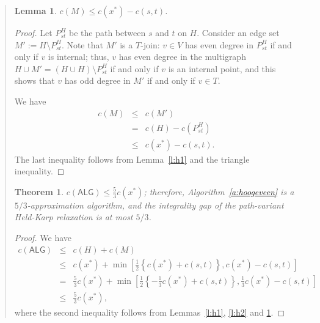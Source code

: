 \documentclass[11pt,letterpaper]{article}
\newtheorem{lemma}{Lemma}
\newtheorem{thm}{Theorem}
\begin{document}
\begin{quote}
\mbox{}

\begin{lemma}
\label{l:h3}
$c(M)\leq c(x^*)-c(s,t)$.
\end{lemma}
\begin{proof}
Let $P_{st}^H$ be the path between $s$ and $t$ on $H$. Consider an edge set $M':=H\setminus P_{st}^H$. Note that $M'$ is a $T$-join: $v\in V$ has even degree in $P_{st}^H$ if and only if $v$ is internal; thus, $v$ has even degree in the multigraph $H\cup M'=(H\cup H)\setminus P_{st}^H$ if and only if $v$ is an internal point, and this shows that $v$ has odd degree in $M'$ if and only if $v\in T$.

We have\begin{eqnarray*}
c(M) &\leq& c(M')\\
&=& c(H)-c(P_{st}^H)\\
&\leq& c(x^*) -c(s,t)
.\end{eqnarray*}The last inequality follows from Lemma~\ref{l:h1} and the triangle inequality.
\end{proof}

\begin{thm}
\label{t:general}
$c(\mathsf{ALG})\leq\frac{5}{3}c(x^*)$; therefore, Algorithm~\ref{a:hoogeveen} is a $5/3$-approximation algorithm, and the integrality gap of the path-variant Held-Karp relaxation is at most $5/3$.
\end{thm}
\begin{proof}
We have
\begin{eqnarray}
c(\mathsf{ALG}) &\leq& c(H)+c(M)\nonumber\\
&\leq& c(x^*)+\min\left [\frac{1}{2}\left\{c(x^*)+c(s,t)\right\} , c(x^*)-c(s,t) \right ]\nonumber\\
&=& \frac{5}{3}c(x^*)+\min\left [\frac{1}{2}\left\{-\frac{1}{3}c(x^*)+c(s,t)\right\} , \frac{1}{3}c(x^*)-c(s,t) \right ]\nonumber\\
&\leq& \frac{5}{3}c(x^*)\label{e:crit}
,\end{eqnarray}where the second inequality follows from Lemmas~\ref{l:h1}, \ref{l:h2} and \ref{l:h3}.
\end{proof}


\end{quote}
\end{document}
